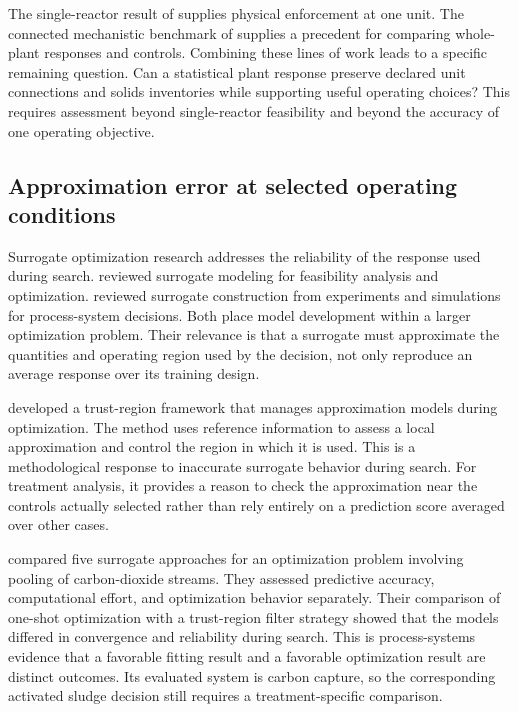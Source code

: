 The single-reactor result of \citet{Selerio2026} supplies physical enforcement at one unit. The connected mechanistic benchmark of \citet{Alex2008} supplies a precedent for comparing whole-plant responses and controls. Combining these lines of work leads to a specific remaining question. Can a statistical plant response preserve declared unit connections and solids inventories while supporting useful operating choices? This requires assessment beyond single-reactor feasibility and beyond the accuracy of one operating objective.

\subsection{Approximation error at selected operating conditions}

Surrogate optimization research addresses the reliability of the response used during search. \citet{BhosekarIerapetritou2018} reviewed surrogate modeling for feasibility analysis and optimization. \citet{McBride2019} reviewed surrogate construction from experiments and simulations for process-system decisions. Both place model development within a larger optimization problem. Their relevance is that a surrogate must approximate the quantities and operating region used by the decision, not only reproduce an average response over its training design.

\citet{Alexandrov1998} developed a trust-region framework that manages approximation models during optimization. The method uses reference information to assess a local approximation and control the region in which it is used. This is a methodological response to inaccurate surrogate behavior during search. For treatment analysis, it provides a reason to check the approximation near the controls actually selected rather than rely entirely on a prediction score averaged over other cases.

\citet{Pedrozo2025} compared five surrogate approaches for an optimization problem involving pooling of carbon-dioxide streams. They assessed predictive accuracy, computational effort, and optimization behavior separately. Their comparison of one-shot optimization with a trust-region filter strategy showed that the models differed in convergence and reliability during search. This is process-systems evidence that a favorable fitting result and a favorable optimization result are distinct outcomes. Its evaluated system is carbon capture, so the corresponding activated sludge decision still requires a treatment-specific comparison.

